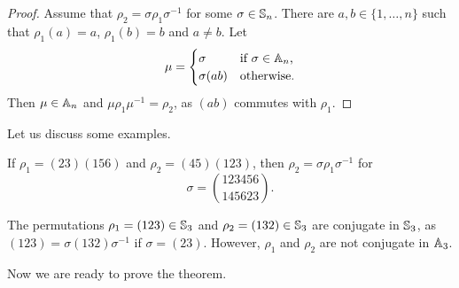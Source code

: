 \begin{proof}
Assume that $\rho_2=\sigma\rho_1\sigma^{-1}$ for some $\sigma\in\mathbb{S}_n$. 
There are $a,b\in\{1,\dots,n\}$ such that
$\rho_1(a)=a$, $\rho_1(b)=b$ and $a\ne b$. Let 
\[
\mu=\begin{cases}
\sigma & \text{if $\sigma\in\mathbb{A}_n$,}\\
\sigma(ab) & \text{otherwise.}
\end{cases}
\]
Then $\mu\in\mathbb{A}_n$ and $\mu\rho_1\mu^{-1}=\rho_2$, as 
$(ab)$ commutes with $\rho_1$. 
\end{proof}

Let us discuss some examples.

\begin{example}
If $\rho_1=(23)(156)$ and $\rho_2=(45)(123)$, then 
$\rho_2=\sigma\rho_1\sigma^{-1}$ for  
\[
\sigma=\binom{123456}{145623}.
\]
\end{example}

\begin{example}
The permutations $\rho_1=(123)\in\mathbb{S}_3$ and $\rho_2=(132)\in\mathbb{S}_3$ are conjugate 
in $\mathbb{S}_3$, as  
$(123)=\sigma(132)\sigma^{-1}$ if $\sigma=(23)$. However, $\rho_1$ and $\rho_2$ are not conjugate in $\mathbb{A}_3$. 
\end{example}

Now we are ready to prove the theorem. 

